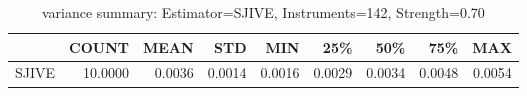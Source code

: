 \begin{table}[ht]
\centering
\caption{variance summary: Estimator=SJIVE, Instruments=142, Strength=0.70}
\begin{tabular}{lrrrrrrrr}
\toprule
 & COUNT & MEAN & STD & MIN & 25\% & 50\% & 75\% & MAX \\
\midrule
SJIVE & 10.0000 & 0.0036 & 0.0014 & 0.0016 & 0.0029 & 0.0034 & 0.0048 & 0.0054 \\
\bottomrule
\end{tabular}
\end{table}
